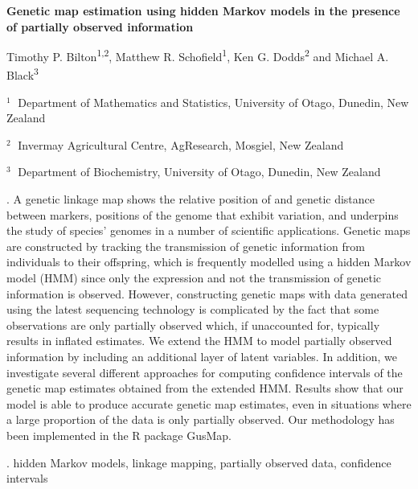 \documentclass[12pt]{article}
\begin{document}
\begin{flushleft}


{\LARGE\bf Genetic map estimation using hidden Markov models in the presence of partially observed information}

\vspace{1.0cm}

Timothy P. Bilton\textsuperscript{1,2}, Matthew R. Schofield\textsuperscript{1}, Ken G. Dodds\textsuperscript{2} and Michael A. Black\textsuperscript{3}\\

\begin{description}

\item $^1 \;$ Department of Mathematics and Statistics, University of Otago, Dunedin, New Zealand

\item $^2 \;$ Invermay Agricultural Centre, AgResearch, Mosgiel, New Zealand

\item $^3 \;$ Department of Biochemistry, University of Otago, Dunedin, New Zealand

\end{description}

\end{flushleft}


\vspace{0.75cm}

. A genetic linkage map shows the relative position of and genetic distance between markers, positions of the genome that exhibit variation, and underpins the study of species' genomes in a number of scientific applications. Genetic maps are constructed by tracking the transmission of genetic information from individuals to their offspring, which is frequently modelled using a hidden Markov model (HMM) since only the expression and not the transmission of genetic information is observed. However, constructing genetic maps with data generated using the latest sequencing technology is complicated by the fact that some observations are only partially observed which, if unaccounted for, typically results in inflated estimates. We extend the HMM to model partially observed information by including an additional layer of latent variables. In addition, we investigate several different approaches for computing confidence intervals of the genetic map estimates obtained from the extended HMM. Results show that our model is able to produce accurate genetic map estimates, even in situations where a large proportion of the data is only partially observed. Our methodology has been implemented in the R package GusMap.

\vskip 2mm

.
hidden Markov models, linkage mapping, partially observed data, confidence intervals
\end{document}
